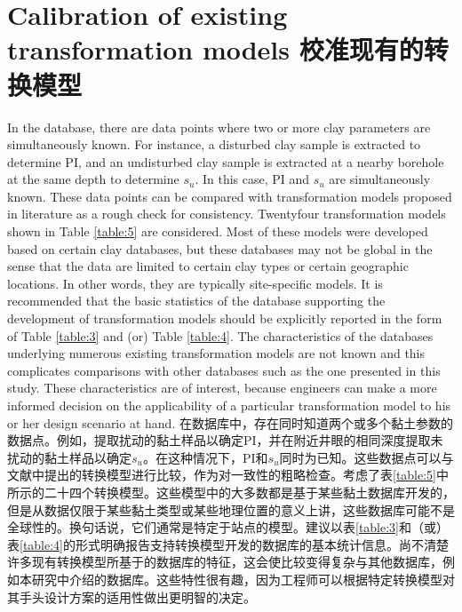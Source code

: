 \section{Calibration of existing transformation models 校准现有的转换模型}

\begin{Parallel}{0.60\textwidth}{}
    \ParallelLText
    {
        In the database, there are data points where two or more clay parameters are simultaneously known. For instance, a disturbed clay sample is extracted to determine PI, and an undisturbed clay sample is extracted at a nearby borehole at the same depth to determine $s_u$. In this case, PI and $s_u$ are simultaneously known. These data points can be compared with transformation models proposed in literature as a rough check for consistency. Twentyfour transformation models shown in Table \ref{table:5} are considered. Most of these models were developed based on certain clay databases, but these databases may not be global in the sense that the data are limited to certain clay types or certain geographic locations. In other words, they are typically site-specific models. It is recommended that the basic statistics of the database supporting the development of transformation models should be explicitly reported in the form of Table \ref{table:3} and (or) Table \ref{table:4}. The characteristics of the databases underlying numerous existing transformation models are not known and this complicates comparisons with other databases such as the one presented in this study. These characteristics are of interest, because engineers can make a more informed decision on the applicability of a particular transformation model to his or her design scenario at hand.
    }
    \ParallelRText
    {
        在数据库中，存在同时知道两个或多个黏土参数的数据点。例如，提取扰动的黏土样品以确定PI，并在附近井眼的相同深度提取未扰动的黏土样品以确定$s_u$。在这种情况下，PI和$s_u$同时为已知。这些数据点可以与文献中提出的转换模型进行比较，作为对一致性的粗略检查。考虑了表\ref{table:5}中所示的二十四个转换模型。这些模型中的大多数都是基于某些黏土数据库开发的，但是从数据仅限于某些黏土类型或某些地理位置的意义上讲，这些数据库可能不是全球性的。换句话说，它们通常是特定于站点的模型。建议以表\ref{table:3}和（或）表\ref{table:4}的形式明确报告支持转换模型开发的数据库的基本统计信息。尚不清楚许多现有转换模型所基于的数据库的特征，这会使比较变得复杂与其他数据库，例如本研究中介绍的数据库。这些特性很有趣，因为工程师可以根据特定转换模型对其手头设计方案的适用性做出更明智的决定。
    }
    \ParallelPar
    
    \ParallelLText

\end{Parallel}
